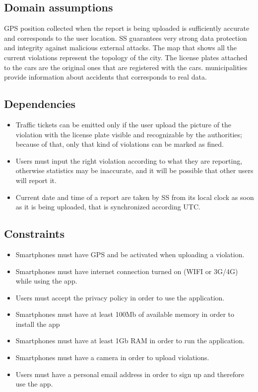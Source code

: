 \documentclass[../RASD.tex]{subfiles}
\begin{document}
    \subsection{Domain assumptions}\label{subsec:domain-assumpiton}
    \begin{enumerate}
         GPS position collected when the report is being uploaded is sufficiently accurate and corresponds to the user location.
         SS guarantees very strong data protection and integrity against malicious external attacks.
         The map that shows all the current violations represent the topology of the city.
         The license plates attached to the cars are the original ones that are registered with the cars.
         municipalities provide information about accidents that corresponds to real data.
    \end{enumerate}
    \subsection{Dependencies}\label{subsec:dependencies}
    \begin{itemize}
        \item Traffic tickets can be emitted only if the user upload the picture of the violation with the license plate visible and recognizable by the authorities; because of that, only that kind of violations can be marked as fined.
        \item Users must input the right violation according to what they are reporting, otherwise statistics may be inaccurate, and it will be possible that other users will report it.
        \item Current date and time of a report are taken by SS from its local clock as soon as it is being uploaded, that is synchronized according UTC.
    \end{itemize}
    \subsection{Constraints}\label{subsec:constraints}
    \begin{itemize}
        \item Smartphones must have GPS and be activated when uploading a violation.
        \item Smartphones must have internet connection turned on (WIFI or 3G/4G) while using the app.
        \item Users must accept the privacy policy in order to use the application.
        \item Smartphones must have at least 100Mb of available memory in order to install the app
        \item Smartphones must have at least 1Gb RAM in order to run the application.
        \item Smartphones must have a camera in order to upload violations.
        \item Users must have a personal email address in order to sign up and therefore use the app.
    \end{itemize}
\end{document}
